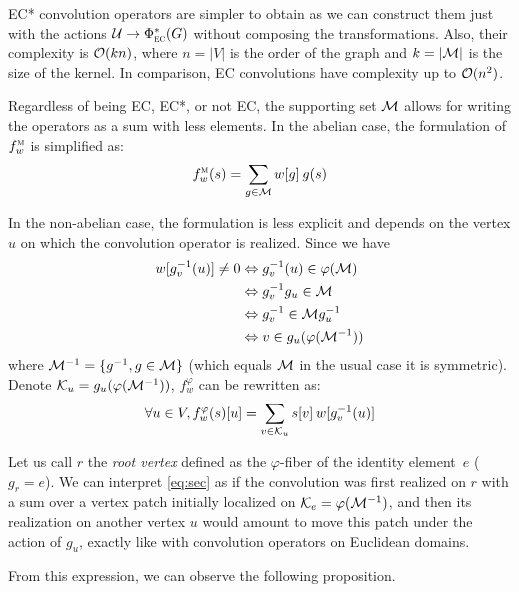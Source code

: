 \begin{remark}EC* convolution operators are simpler to obtain as we can construct them just with the actions $\cu \to \Phi^*_{\EC}(G)$ without composing the transformations. Also, their complexity is $\co(kn)$, where $n = |V|$ is the order of the graph and $k = |\cm|$ is the size of the kernel. In comparison, EC convolutions have complexity up to $\co(n^2)$.
\end{remark}

Regardless of being EC, EC*, or not EC, the supporting set $\cm$ allows for writing the operators as a sum with less elements. In the abelian case, the formulation of $f_w^{\M}$ is simplified as:
\begin{gather}
f_w^{\M}(s) = \displaystyle\sum_{g \in \cm} w[g] \h{2} g(s) \label{eq:secm}
\end{gather}

In the non-abelian case, the formulation is less explicit and depends on the vertex $u$ on which the convolution operator is realized. Since we have
\begin{align*}
w[g_v^{-1}(u)] \neq 0 & \Leftrightarrow g_v^{-1}(u) \in \varphi(\cm)\\
                    & \Leftrightarrow g_v^{-1}g_u \in \cm\\
                    & \Leftrightarrow g_v^{-1} \in \cm g_u^{-1}\\
                    & \Leftrightarrow v \in g_u(\varphi(\cm^{-1}))
\end{align*}
where $\cm^{-1} = \{ g^{-1}, g \in \cm\}$ (which equals $\cm$ in the usual case it is symmetric). Denote $\ck_u = g_u(\varphi(\cm^{-1}))$, $f_w^{\varphi}$ can be rewritten as:
\begin{gather}
\forall u \in V, f_w^{\varphi}(s)[u] = \displaystyle\sum_{ v \in \ck_u} s[v] \h{2} w[g_v^{-1}(u)] \label{eq:sec}
\end{gather}

Let us call $r$ the \emph{root vertex} defined as the $\varphi$-fiber of the identity element~$e$ (\ie $g_r = e$). We can interpret \eqref{eq:sec} as if the convolution was first realized on $r$ with a sum over a vertex patch initially localized on $\ck_e = \varphi(\cm^{-1})$, and then its realization on another vertex $u$ would amount to move this patch under the action of $g_u$, exactly like with convolution operators on Euclidean domains.

From this expression, we can observe the following proposition.


